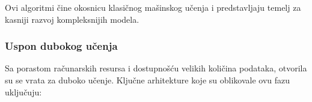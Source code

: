 Ovi algoritmi čine okosnicu klasičnog mašinskog učenja i predstavljaju temelj za kasniji razvoj kompleksnijih modela.
\newpage
\subsubsection{Uspon dubokog učenja}
Sa porastom računarskih resursa i dostupnošću velikih količina podataka, otvorila su se vrata za duboko učenje. Ključne arhitekture koje su oblikovale ovu fazu uključuju:
\newpage 